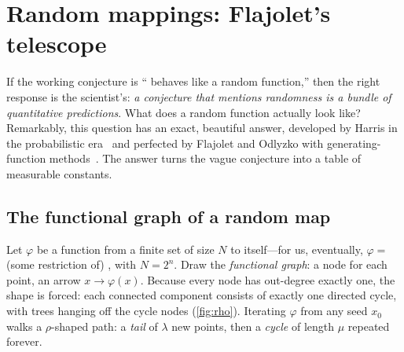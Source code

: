 \section{Random mappings: Flajolet's telescope}\label{sec:randommaps}

If the working conjecture is ``\SHA{} behaves like a random function,''
then the right response is the scientist's: \emph{a conjecture that
mentions randomness is a bundle of quantitative predictions}. What does a
random function actually look like? Remarkably, this question has an
exact, beautiful answer, developed by Harris in the probabilistic
era~\citep{Harris1960} and perfected by Flajolet and Odlyzko with
generating-function methods~\citep{FlajoletOdlyzko1990}. The answer turns
the vague conjecture into a table of measurable constants.

\subsection{The functional graph of a random map}\label{sec:fungraph}

Let $\varphi$ be a function from a finite set of size $N$ to itself---for
us, eventually, $\varphi = $ (some restriction of) \SHA{}, with
$N = 2^n$. Draw the \emph{functional graph}: a node for each point, an
arrow $x \to \varphi(x)$. Because every node has out-degree exactly one,
the shape is forced: each connected component consists of exactly one
directed cycle, with trees hanging off the cycle nodes
(\cref{fig:rho}). Iterating $\varphi$ from any seed $x_0$ walks a
$\rho$-shaped path: a \emph{tail} of $\lambda$ new points, then a
\emph{cycle} of length $\mu$ repeated forever.

